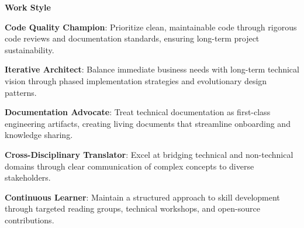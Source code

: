 \documentclass[a4paper,10pt]{article}
\begin{document}
\vspace{0.5cm}
\noindent
\begin{minipage}{\textwidth}
	{\large\bfseries\color{darkblue}\selectfont Work Style}
	\vspace{0.3cm}

	\noindent\textbf{Code Quality Champion}: Prioritize clean, maintainable code through rigorous code reviews and documentation standards, ensuring long-term project sustainability.

	\vspace{0.3cm}
	\noindent\textbf{Iterative Architect}: Balance immediate business needs with long-term technical vision through phased implementation strategies and evolutionary design patterns.

	\vspace{0.3cm}
	\noindent\textbf{Documentation Advocate}: Treat technical documentation as first-class engineering artifacts, creating living documents that streamline onboarding and knowledge sharing.

	\vspace{0.3cm}
	\noindent\textbf{Cross-Disciplinary Translator}: Excel at bridging technical and non-technical domains through clear communication of complex concepts to diverse stakeholders.

	\vspace{0.3cm}
	\noindent\textbf{Continuous Learner}: Maintain a structured approach to skill development through targeted reading groups, technical workshops, and open-source contributions.
\end{minipage}
\end{document}
